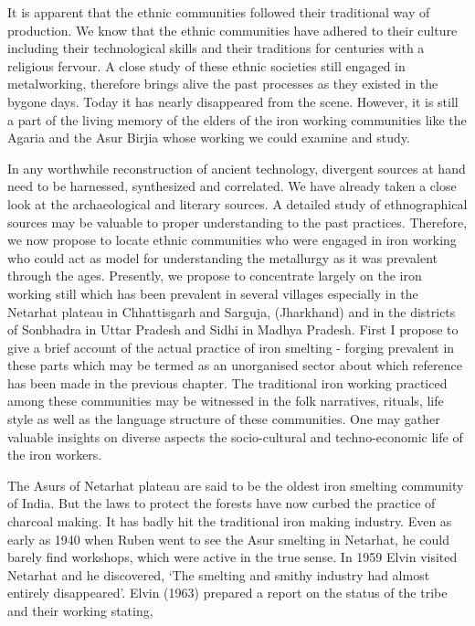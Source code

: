 It is apparent that the ethnic communities followed their traditional way of production. We know that the ethnic communities have adhered to their culture including their technological skills and their traditions for centuries with a religious fervour. A close study of these ethnic societies still engaged in metalworking, therefore brings alive the past processes as they existed in the bygone days. Today it has nearly disappeared from the scene. However, it is still a part of the living memory of the elders of the iron working communities like the Agaria and the Asur Birjia whose working we could examine and study. 

In any worthwhile reconstruction of ancient technology, divergent sources at hand need to be harnessed, synthesized and correlated. We have already taken a close look at the archaeological and literary sources. A detailed study of ethnographical sources may be valuable to proper understanding to the past practices. Therefore, we now propose to locate ethnic communities who were engaged in iron working who could act as model for understanding the metallurgy as it was prevalent through the ages. Presently, we propose to concentrate largely on the iron working still which has been prevalent in several villages especially in the Netarhat plateau in Chhattisgarh and Sarguja, (Jharkhand) and in the districts of Sonbhadra in Uttar Pradesh and Sidhi in Madhya Pradesh. First I propose to give a brief account of the actual practice of iron smelting - forging prevalent in these parts which may be termed as an unorganised sector about which reference has been made in the previous chapter. The traditional iron working practiced among these communities may be witnessed in the folk narratives, rituals, life style as well as the language structure of these communities. One may gather valuable insights on diverse aspects the socio-cultural and techno-economic life of the iron workers.

The Asurs of Netarhat plateau are said to be the oldest iron smelting community of India. But the laws to protect the forests have now curbed the practice of charcoal making. It has badly hit the traditional iron making industry. Even as early as 1940 when Ruben went to see the Asur smelting in Netarhat, he could barely find workshops, which were active in the true sense. In 1959 Elvin visited Netarhat and he discovered, ‘The smelting and smithy industry had almost entirely disappeared’. Elvin (1963) prepared a report on the status of the tribe and their working stating, 

